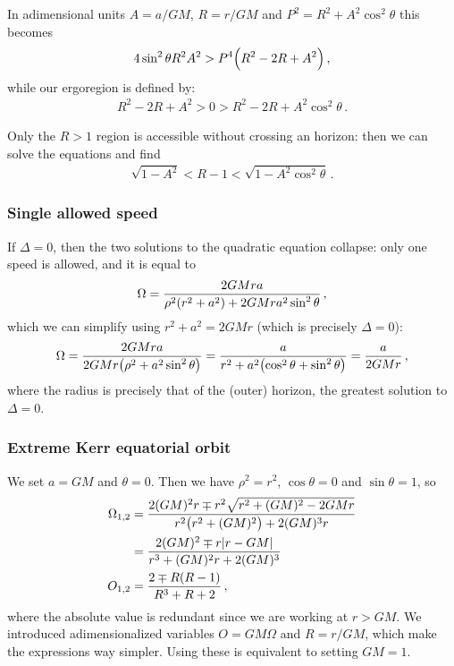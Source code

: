 \documentclass[main.tex]{subfiles}
\begin{document}
In adimensional units \(A = a/GM\), \(R = r / GM\) and \(P^2 = R^2+A^2 \cos^2\theta \) this becomes 
%
\begin{align}
4 \sin^2\theta R^2A^2 > P^4 \qty(R^2-2R + A^2)
\,,
\end{align}
%
while our ergoregion is defined by: 
%
\begin{align}
R^2- 2R + A^2 > 0 > R^2 - 2R + A^2 \cos^2\theta 
\,.
\end{align}

Only the \(R>1\) region is accessible without crossing an horizon: then we can solve the equations and find 
%
\begin{align}
 \sqrt{1 - A^2} < R-1 < \sqrt{1 - A^2 \cos^2\theta }
\,.
\end{align}
%


\subsubsection{Single allowed speed}

If \(\Delta = 0\), then the two solutions to the quadratic equation collapse: only one speed is allowed, and it is equal to 
%
\begin{align}
\Omega = \frac{2GMra}{\rho^2 \qty(r^2+a^2) + 2GMr a^2 \sin^2\theta }
\,,
\end{align}
%
which we can simplify using \(r^2+a^2 = 2GMr\) (which is  precisely \(\Delta = 0\)): 
%
\begin{align}
\Omega = \frac{2GMra}{2GMr \qty( \rho^2 + a^2 \sin^2 \theta )} = \frac{a}{r^2 + a^2 \qty(\cos^2\theta +\sin^2\theta )} = \frac{a}{2GMr}
\,,
\end{align}
%
where the radius is precisely that of the (outer) horizon, the greatest solution  to \(\Delta = 0\). 

\subsubsection{Extreme Kerr equatorial orbit}

We set \(a = GM\) and \(\theta  = 0\). Then we have \(\rho^2= r^2\), \(\cos \theta = 0\) and \(\sin \theta =1\), so
%
\begin{align}
\Omega_{1, 2} &= \frac{2 (GM)^2 r \mp r^2\sqrt{r^2 + (GM)^2 - 2GMr}}{r^2 \qty(r^2 +(GM)^2) + 2 (GM)^3 r}  \\
&= \frac{2 (GM)^2 \mp r \abs{r - GM}}{r^3+(GM)^2r + 2 (GM)^3} \\
O_{1,2}&= \frac{2 \mp R (R-1)}{R^3+R + 2}
\,,
\end{align}
%
where the absolute value is redundant since we are working at \(r > GM\).
We introduced adimensionalized variables \(O = GM \Omega \) and \(R = r/GM\), which make the expressions way simpler. Using these is equivalent to setting \(GM = 1\). 
\end{document}
